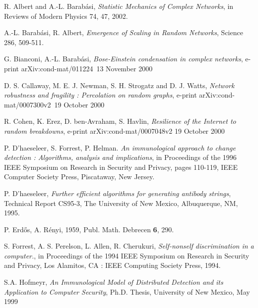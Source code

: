 \documentclass{article}
\begin{document}
\begin{thebibliography}{99}

R. Albert and A.-L. Barab\'{a}si, {\it Statistic Mechanics of Complex Networks}, in Reviews of Modern Physics 74, 47, 2002.

A.-L. Barab\'{a}si, R. Albert, {\it Emergence of Scaling in Random Networks}, Science 286, 509-511.

G. Bianconi, A.-L. Barab\'{a}si, {\it Bose-Einstein condensation in complex networks},
e-print arXiv:cond-mat/011224~13 November 2000

D. S. Callaway, M. E. J. Newman, S. H. Strogatz and D. J. Watts, {\it Network robustness and fragility : Percolation on random graphs},  e-print arXiv:cond-mat/0007300v2~19 October 2000

R. Cohen, K. Erez, D. ben-Avraham, S. Havlin, {\it Resilience of the Internet to random breakdowns}, e-print arXiv:cond-mat/0007048v2 19 October 2000


P. D'haeseleer, S. Forrest, P. Helman. {\it An immunological approach to change detection : Algorithms, analysis and implications}, in Proceedings of the 1996 IEEE Symposium on Research in Security and Privacy, pages 110-119, IEEE Computer Society Press, Piscataway, New Jersey. 

P. D'haeseleer, {\it Further efficient algorithms for generating antibody strings}, Technical Report CS95-3, The University of New Mexico, Albuquerque, NM, 1995.

P. Erd\H os, A. R\'{e}nyi, 1959, Publ. Math. Debrecen {\bf 6}, 290.

S. Forrest, A. S. Perelson, L. Allen, R. Cherukuri, {\it Self-nonself discrimination in a computer.}, in Proceedings of the 1994 IEEE Symposium on Research in Security and Privacy, Los Alamitos, CA : IEEE Computing Society Press, 1994.

S.A. Hofmeyr, {\it An Immunological Model of Distributed Detection and its Application to Computer Security}, Ph.D. Thesis, University of New Mexico, May 1999


\end{thebibliography}
\end{document}

